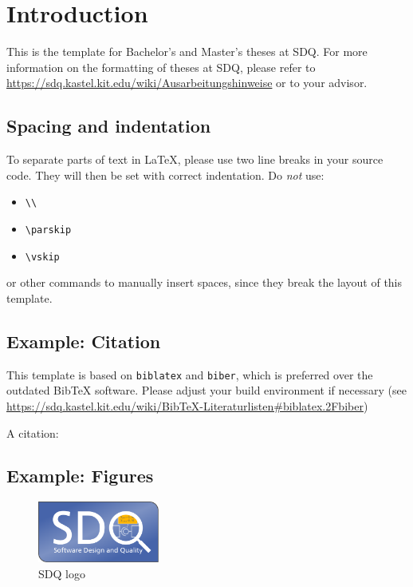 
\chapter{Introduction}
\label{ch:Introduction}


This is the template for Bachelor's and Master's theses at SDQ.
For more information on the formatting of theses at SDQ, please refer to
\url{https://sdq.kastel.kit.edu/wiki/Ausarbeitungshinweise} or to your advisor.

\section{Spacing and indentation}
To separate parts of text in \LaTeX, please use two line breaks in your source code.
They will then be set with correct indentation.
Do \emph{not} use:
\begin{itemize}
  \itemsep0em
  \item \texttt{\textbackslash\textbackslash}
  \item \texttt{\textbackslash parskip}
  \item \texttt{\textbackslash vskip}
\end{itemize} 
or other commands to manually insert spaces, since they break the layout of this template.

\section{Example: Citation}
\label{sec:Introduction:Citation}
This template is based on \texttt{biblatex} and \texttt{biber}, which is preferred over the
outdated Bib\TeX{} software.
Please adjust your build environment if necessary (see
\url{https://sdq.kastel.kit.edu/wiki/BibTeX-Literaturlisten#biblatex.2Fbiber})

A citation:~\cite{fuchss2025lissa}

\section{Example: Figures}
\label{sec:Introduction:Figures}
\begin{figure}
\centering
\includegraphics[width=4cm]{logos/sdqlogo}
\caption{SDQ logo}
\label{fig:sdqlogo}
\end{figure}

